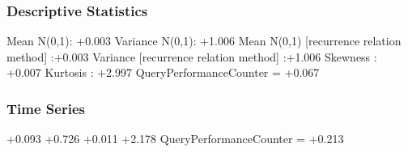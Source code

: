 \documentclass[9pt]{article}
\theoremstyle{plain}
\theoremstyle{definition}
\theoremstyle{remark}
\numberwithin{equation}{section}
\begin{document}
\subsubsection{Descriptive Statistics}
Mean N(0,1): +0.003
Variance N(0,1): +1.006
Mean N(0,1) [recurrence relation method] :+0.003
Variance [recurrence relation method] :+1.006
Skewness : +0.007
Kurtosis : +2.997
QueryPerformanceCounter  =  +0.067
\subsubsection{Time Series }
+0.093
+0.726
+0.011
+2.178
QueryPerformanceCounter  =  +0.213
\end{document}
